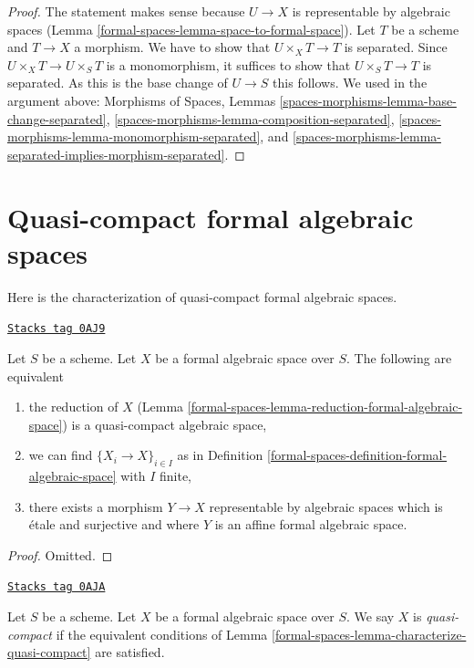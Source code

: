 \begin{proof}
The statement makes sense because $U \to X$ is representable by
algebraic spaces (Lemma \ref{formal-spaces-lemma-space-to-formal-space}).
Let $T$ be a scheme and $T \to X$ a morphism. We have to show
that $U \times_X T \to T$ is separated. Since $U \times_X T \to U \times_S T$
is a monomorphism, it suffices to show that $U \times_S T \to T$
is separated. As this is the base change of $U \to S$ this
follows. We used in the argument above:
Morphisms of Spaces, Lemmas
\ref{spaces-morphisms-lemma-base-change-separated},
\ref{spaces-morphisms-lemma-composition-separated},
\ref{spaces-morphisms-lemma-monomorphism-separated}, and
\ref{spaces-morphisms-lemma-separated-implies-morphism-separated}.
\end{proof}

\section{Quasi-compact formal algebraic spaces}
\label{formal-spaces-section-quasi-compact}
Here is the characterization of quasi-compact formal algebraic
spaces.

\begin{lemma}
\label{formal-spaces-lemma-characterize-quasi-compact}
\href{https://stacks.math.columbia.edu/tag/0AJ9}{\texttt{Stacks tag 0AJ9}}

Let $S$ be a scheme. Let $X$ be a formal algebraic space over $S$.
The following are equivalent
\begin{enumerate}
\item the reduction of $X$
(Lemma \ref{formal-spaces-lemma-reduction-formal-algebraic-space}) is a quasi-compact
algebraic space,
\item we can find $\{X_i \to X\}_{i \in I}$ as in
Definition \ref{formal-spaces-definition-formal-algebraic-space} with $I$ finite,
\item there exists a morphism $Y \to X$ representable by algebraic
spaces which is \'etale and surjective and where
$Y$ is an affine formal algebraic space.
\end{enumerate}
\end{lemma}

\begin{proof}
Omitted.
\end{proof}

\begin{definition}
\label{formal-spaces-definition-quasi-compact}
\href{https://stacks.math.columbia.edu/tag/0AJA}{\texttt{Stacks tag 0AJA}}

Let $S$ be a scheme. Let $X$ be a formal algebraic space over $S$.
We say $X$ is {\it quasi-compact} if the equivalent conditions of
Lemma \ref{formal-spaces-lemma-characterize-quasi-compact} are satisfied.
\end{definition}

